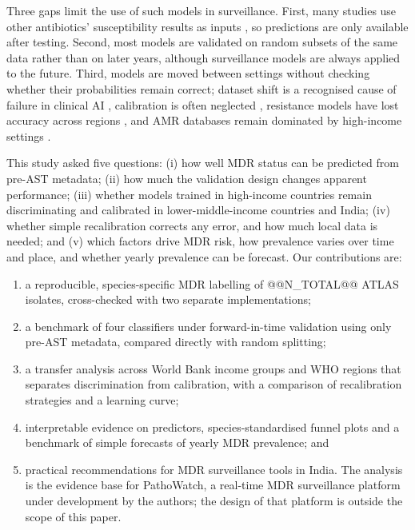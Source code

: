 \documentclass[conference]{IEEEtran}
\begin{document}
Three gaps limit the use of such models in surveillance. First, many studies use other antibiotics' susceptibility results as inputs \cite{valavarasu2025,wishal2026}, so predictions are only available after testing. Second, most models are validated on random subsets of the same data rather than on later years, although surveillance models are always applied to the future. Third, models are moved between settings without checking whether their probabilities remain correct; dataset shift is a recognised cause of failure in clinical AI \cite{finlayson2021,wong2021}, calibration is often neglected \cite{vancalster2019}, resistance models have lost accuracy across regions \cite{nsubuga2024}, and AMR databases remain dominated by high-income settings \cite{centner2026}.

This study asked five questions: (i) how well MDR status can be predicted from pre-AST metadata; (ii) how much the validation design changes apparent performance; (iii) whether models trained in high-income countries remain discriminating and calibrated in lower-middle-income countries and India; (iv) whether simple recalibration corrects any error, and how much local data is needed; and (v) which factors drive MDR risk, how prevalence varies over time and place, and whether yearly prevalence can be forecast. Our contributions are:
\begin{enumerate}
\item a reproducible, species-specific MDR labelling of @@N_TOTAL@@ ATLAS isolates, cross-checked with two separate implementations;
\item a benchmark of four classifiers under forward-in-time validation using only pre-AST metadata, compared directly with random splitting;
\item a transfer analysis across World Bank income groups and WHO regions that separates discrimination from calibration, with a comparison of recalibration strategies and a learning curve;
\item interpretable evidence on predictors, species-standardised funnel plots and a benchmark of simple forecasts of yearly MDR prevalence; and
\item practical recommendations for MDR surveillance tools in India. The analysis is the evidence base for PathoWatch, a real-time MDR surveillance platform under development by the authors; the design of that platform is outside the scope of this paper.
\end{enumerate}

\end{document}
